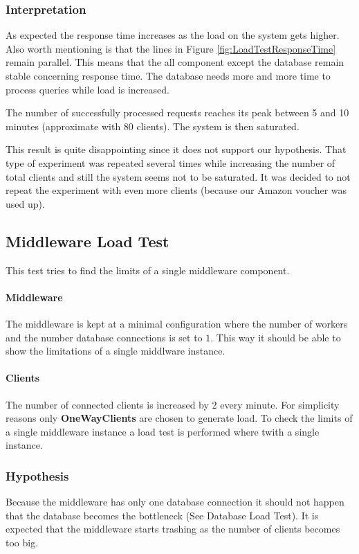 \documentclass[milestone1.tex]{subfiles}
\begin{document}
\subsubsection{Interpretation}

As expected the response time increases as the load on the system gets higher. Also worth mentioning is that the lines in Figure \ref{fig:LoadTestResponseTime} remain parallel. This means that the all component except the database remain stable concerning response time. The database needs more and more time to process queries while load is increased.

The number of successfully processed requests reaches its peak between 5 and 10 minutes (approximate with 80 clients). The system is then saturated.

This result is quite disappointing since it does not support our hypothesis. That type of experiment was repeated several times while increasing the number of total clients and still the system seems not to be saturated. It was decided to not repeat the experiment with even more clients (because our Amazon voucher was used up).


\subsection{Middleware Load Test}
This test tries to find the limits of a single middleware component. 

\paragraph{Middleware}
The middleware is kept at a minimal configuration where the number of workers and the number database connections is set to $1$. This way it should be able to show the limitations of a single middlware instance.

\paragraph{Clients}
The number of connected clients is increased by 2 every minute. For simplicity reasons only \textbf{OneWayClients} are chosen to generate load.
To check the limits of a single middleware instance a load test is performed where twith a single instance.


\subsubsection{Hypothesis}
Because the middleware has only one database connection it should not happen that the database becomes the bottleneck (See Database Load Test). It is expected that the middleware starts trashing as the number of clients becomes too big.
\end{document}

